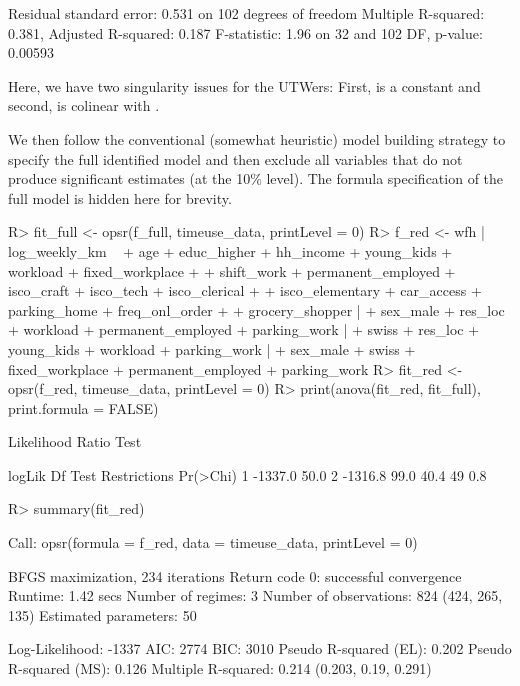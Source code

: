 \documentclass[%
    twoside, openright, titlepage, numbers=noenddot,%
    cleardoublepage=empty,%
    abstract=false,%
    BCOR=5.5mm, paper=a5, fontsize=10pt,%
]{scrreprt}
\begin{document}
\begin{Schunk}
\begin{Soutput}
Residual standard error: 0.531 on 102 degrees of freedom
Multiple R-squared:  0.381,	Adjusted R-squared:  0.187 
F-statistic: 1.96 on 32 and 102 DF,  p-value: 0.00593
\end{Soutput}
\end{Schunk}
%
Here, we have two singularity issues for the UTWers: First,  is a constant and second,  is colinear with .

We then follow the conventional (somewhat heuristic) model building strategy to specify the full identified model and then exclude all variables that do not produce significant estimates (at the 10\% level). The formula specification of the full model is hidden here for brevity.
%
%
\begin{Schunk}
\begin{Sinput}
R> fit_full <- opsr(f_full, timeuse_data, printLevel = 0)
R> f_red <- wfh | log_weekly_km ~
+    age + educ_higher + hh_income + young_kids + workload + fixed_workplace +
+    shift_work + permanent_employed + isco_craft + isco_tech + isco_clerical +
+    isco_elementary + car_access + parking_home + freq_onl_order +
+    grocery_shopper |
+    sex_male + res_loc + workload + permanent_employed + parking_work |
+    swiss + res_loc + young_kids + workload + parking_work |
+    sex_male + swiss + fixed_workplace + permanent_employed + parking_work
R> fit_red <- opsr(f_red, timeuse_data, printLevel = 0)
R> print(anova(fit_red, fit_full), print.formula = FALSE)
\end{Sinput}
\begin{Soutput}
Likelihood Ratio Test

   logLik      Df    Test Restrictions Pr(>Chi)
1 -1337.0    50.0                              
2 -1316.8    99.0    40.4           49      0.8
\end{Soutput}
\begin{Sinput}
R> summary(fit_red)
\end{Sinput}
\begin{Soutput}
Call:
opsr(formula = f_red, data = timeuse_data, printLevel = 0)

BFGS maximization, 234 iterations
Return code 0: successful convergence 
Runtime: 1.42 secs
Number of regimes: 3 
Number of observations: 824 (424, 265, 135)
Estimated parameters: 50 

Log-Likelihood: -1337 
AIC: 2774 
BIC: 3010 
Pseudo R-squared (EL): 0.202 
Pseudo R-squared (MS): 0.126 
Multiple R-squared: 0.214 (0.203, 0.19, 0.291)


\end{Soutput}
\end{Schunk}
\end{document}

